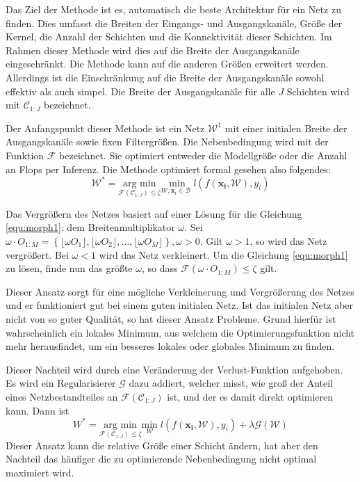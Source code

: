 Das Ziel der Methode ist es, automatisch die beste Architektur für ein Netz zu finden. Dies umfasst die Breiten der Eingangs- und Ausgangskanäle, Größe der Kernel, die Anzahl der Schichten und die Konnektivität dieser Schichten. Im Rahmen dieser Methode wird dies auf die Breite der Ausgangskanäle eingeschränkt. Die Methode kann auf die anderen Größen erweitert werden. Allerdings ist die Einschränkung auf die Breite der Ausgangskanäle sowohl effektiv als auch simpel.
Die Breite der Ausgangskanäle für alle $J$ Schichten wird mit $\mathcal{C}_{1:J}$ bezeichnet. 

Der Anfangspunkt dieser Methode ist ein Netz $\mathcal{W}^1$ mit einer initialen Breite der Ausgangskanäle sowie fixen Filtergrößen. Die Nebenbedingung wird mit der Funktion $\mathcal{F}$ bezeichnet. Sie optimiert entweder die Modellgröße oder die Anzahl an Flops per Inferenz. Die Methode optimiert formal gesehen also folgendes:
\begin{equation}
 \mathcal{W}^{\ast}= \underset{\mathcal{F}(\mathcal{C}_{1:J})\leq \zeta}{\text{arg min}} \underset{\mathcal{W},\mathbf{x}_i \in \mathcal{B}}{\text{ min}}\; l(f(\mathbf{x_i}, \mathcal{W}),y_i)\label{equ:morph1}
\end{equation}

Das Vergrößern des Netzes basiert auf einer Lösung für die Gleichung \ref{equ:morph1}: dem Breitenmultiplikator $\omega$. 
Sei $\omega \cdot O_{1:M} = \left\{ \lfloor \omega O_1 \rfloor, \lfloor \omega O_2 \rfloor, \ldots , \lfloor \omega O_M \rfloor \right\}, \omega>0$. Gilt $\omega>1$, so wird das Netz vergrößert. Bei $\omega <1$ wird das Netz verkleinert. Um die Gleichung \ref{equ:morph1} zu lösen, finde nun das größte $\omega$, so dass $\mathcal{F}(\omega \cdot O_{1:M})\leq \zeta$ gilt.


Dieser Ansatz sorgt für eine mögliche Verkleinerung und Vergrößerung des Netzes und er funktioniert gut bei einem guten initialen Netz. Ist das initialen Netz aber nicht von so guter Qualität, so hat dieser Ansatz Probleme. Grund hierfür ist wahrscheinlich ein lokales Minimum, aus welchem die Optimierungsfunktion nicht mehr herausfindet, um ein besseres lokales oder globales Minimum zu finden.

Dieser Nachteil wird durch eine Veränderung der Verlust-Funktion aufgehoben. Es wird ein Regularisierer $\mathcal{G}$ dazu addiert, welcher misst, wie groß der Anteil eines Netzbestandteiles an $\mathcal{F}( \mathcal{C}_{1:J})$ ist, und der es damit direkt optimieren kann. Dann ist
\begin{equation}
 W^{\ast}= \underset{\mathcal{F}(\mathcal{C}_{1:J})\leq \zeta}{\text{arg min}} \underset{\mathcal{W}}{\text{min}}\; l(f(\mathbf{x_i}, \mathcal{W}),y_i) + \lambda \mathcal{G}( \mathcal{W})  
 \label{equ:morph2}
\end{equation}
Dieser Ansatz kann die relative Größe einer Schicht ändern, hat aber den Nachteil das häufiger die zu optimierende Nebenbedingung nicht optimal maximiert wird.


